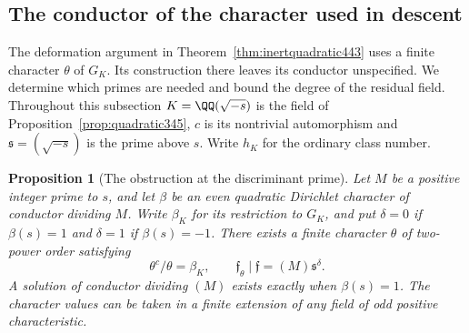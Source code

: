 \documentclass[a4paper,11pt]{article}
\newtheorem{proposition}{Proposition}[section]
\theoremstyle{definition}
\theoremstyle{remark}
\numberwithin{equation}{section}
\begin{document}
\subsection{The conductor of the character used in descent}
\label{sec:rayconductor444}

The deformation argument in Theorem~\ref{thm:inertquadratic443}
uses a finite character \(\theta\) of \(G_K\). Its construction
there leaves its conductor unspecified. We determine which primes
are needed and bound the degree of the residual field. Throughout
this subsection \(K=\QQ(\sqrt{-s})\) is the field of
Proposition~\ref{prop:quadratic345}, \(c\) is its nontrivial
automorphism and \(\mathfrak s=(\sqrt{-s})\) is the prime above
\(s\). Write \(h_K\) for the ordinary class number.

\begin{proposition}[The obstruction at the discriminant prime]\leavevmode
\label{prop:rayobstruction444}
Let \(M\) be a positive integer prime to \(s\), and let \(\beta\)
be an even quadratic Dirichlet character of conductor dividing
\(M\). Write \(\beta_K\) for its restriction to \(G_K\), and put
\(\delta=0\) if \(\beta(s)=1\) and \(\delta=1\) if
\(\beta(s)=-1\). There exists a finite character \(\theta\) of
two-power order satisfying
\[
         \theta^c/\theta=\beta_K,\qquad
         \mathfrak f_\theta\mid
            \mathfrak f=(M)\mathfrak s^\delta .
\]
A solution of conductor dividing \((M)\) exists exactly when
\(\beta(s)=1\). The character values can be taken in a finite
extension of any field of odd positive characteristic.
\end{proposition}
\end{document}
